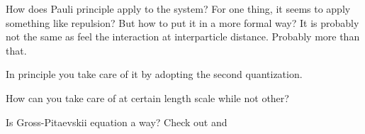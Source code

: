 How does Pauli principle apply to the system?  For one thing, it seems to apply something like repulsion? But how to put it in a more formal way? It is probably not the same as feel the interaction at interparticle distance.  Probably more than that.  

In principle you take care of it by adopting the second quantization.  

How can you take care of at certain length scale while not other? 

Is Gross-Pitaevskii equation a way? Check out \cite{Pethick} and \cite{Leggett}

